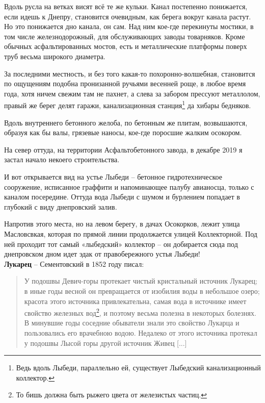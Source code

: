 Вдоль русла на ветках висят всё те же кульки. Канал постепенно понижается, если идешь к Днепру, становится очевидным, как берега вокруг канала растут. Но это понижается дно канала, он сам. Над ним кое-где перекинуты мостики, в том числе железнодорожный, для обслуживающих заводы товарняков. Кроме обычных асфальтированных мостов, есть и металлические платформы поверх труб весьма широкого диаметра.

За последними местность, и без того какая-то похоронно-волшебная, становится по ощущениям подобна пронизанной ручьями весенней роще, в любое время года, хотя ничем свежим там не пахнет, а слева за забором прессуют металлолом, правый же берег делят гаражи, канализационная станция\footnote{Ведь вдоль Лыбеди, параллельно ей, существует Лыбедский канализационный коллектор.} да хибары бедняков.

Вдоль внутреннего бетонного желоба, по бетонным же плитам, возвышаются, образуя как бы валы, грязевые наносы, кое-где поросшие жалким осокором.

На север оттуда, на территории Асфальтобетонного завода, в декабре 2019 я застал начало некоего строительства.

И вот открывается вид на устье Лыбеди – бетонное гидротехническое сооружение, исписанное граффити и напоминающее палубу авианосца, только с каналом посередине. Оттуда вода Лыбеди с шумом и бурлением попадает в глубокий с виду днепровский залив.

Напротив этого места, но на левом берегу, в дачах Осокорков, лежит улица Масловсвкая, которая по прямой линии продолжается улицей Коллекторной. Под ней проходит тот самый «лыбедский» коллектор – он добирается сюда под днепровском дном идет эдак от правобережного устья Лыбеди!\\

\textbf{Лукарец} – Сементовский в 1852 году писал:

\begin{quotation}
У подошвы Девич-горы протекает чистый кристальный источник Лукарец; в иные годы весной он превращается от изобилия воды в небольшое озеро; красота этого источника привлекательна, самая вода в источнике имеет свойство железных вод\footnote{То бишь должна быть рыжего цвета от железистых частиц.}, и поэтому весьма полезна в некоторых болезнях. В минувшие годы соседние обыватели знали это свойство Лукарца и пользовались его врачебною водою. Недалеко от этого источника протекал у подошвы Лысой горы другой источник Живец [...]
\end{quotation}

